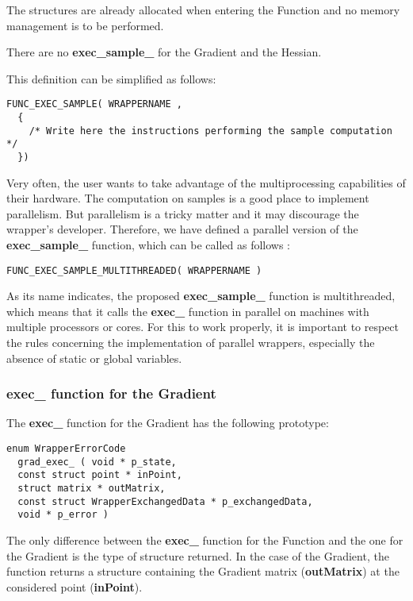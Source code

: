 The structures are already allocated when entering the Function and no memory management is to be performed.

There are no {\bf exec\_sample\_} for the Gradient and the Hessian.

This definition can be simplified as follows:
\lstset{language=C++, basicstyle=\normalsize}
\begin{lstlisting}[frame=TBRL]
  FUNC_EXEC_SAMPLE( WRAPPERNAME ,
  {
    /* Write here the instructions performing the sample computation */
  })
\end{lstlisting}

Very often, the user wants to take advantage of the multiprocessing capabilities of their hardware. The computation on samples is a good place to implement parallelism. But parallelism is a tricky matter and it may discourage the wrapper's developer. Therefore, we have defined a parallel version of the {\bf exec\_sample\_} function, which can be called as follows :
\lstset{language=C++, basicstyle=\normalsize}
\begin{lstlisting}[frame=TBRL]
  FUNC_EXEC_SAMPLE_MULTITHREADED( WRAPPERNAME )
\end{lstlisting}

As its name indicates, the proposed {\bf exec\_sample\_} function is multithreaded, which means that it calls the {\bf exec\_} function in parallel on machines with multiple processors or cores. For this to work properly, it is important to respect the rules concerning the implementation of parallel wrappers, especially the absence of static or global variables.

\subsubsection{exec\_ function for the Gradient}

The {\bf exec\_} function for the Gradient has the following prototype:

\lstset{language=C++, basicstyle=\normalsize}
\begin{lstlisting}[frame=TBRL]
  enum WrapperErrorCode
  grad_exec_ ( void * p_state,
  const struct point * inPoint,
  struct matrix * outMatrix,
  const struct WrapperExchangedData * p_exchangedData,
  void * p_error )
\end{lstlisting}

The only difference between the {\bf exec\_} function for the Function and the one for the Gradient is the type of structure returned. In the case of the Gradient, the function returns a  structure containing the Gradient matrix ({\bf outMatrix}) at the considered point ({\bf inPoint}).

